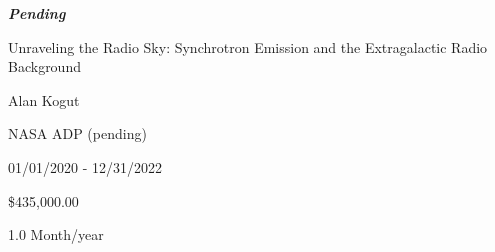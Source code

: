 \documentclass[11pt]{article}
\begin{document}
\vspace{0.1in}

\noindent \large{\textbf{\emph{Pending}}}

\vspace{0.1in}

 Unraveling the Radio Sky: Synchrotron Emission and the
Extragalactic Radio Background

    Alan Kogut

 NASA ADP (pending) 

 01/01/2020 - 12/31/2022

 \$435,000.00

 1.0 Month/year

\vspace{0.1in}
\end{document}
